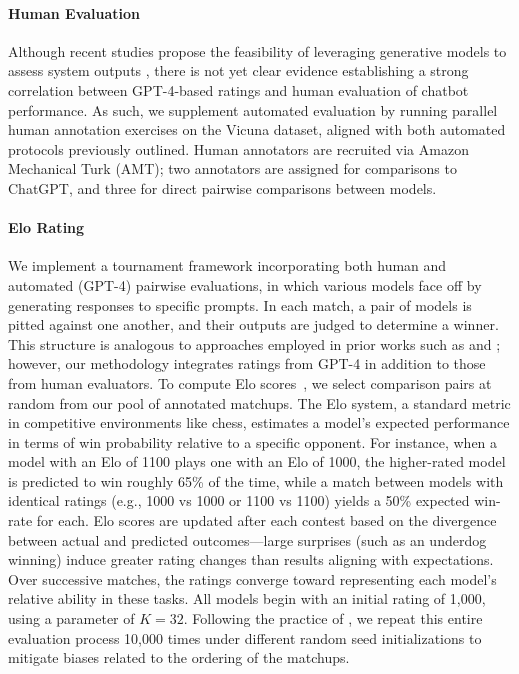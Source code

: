 \paragraph{Human Evaluation} Although recent studies propose the feasibility of leveraging generative models to assess system outputs \citep{fu2023gptscore}, there is not yet clear evidence establishing a strong correlation between GPT-4-based ratings and human evaluation of chatbot performance. As such, we supplement automated evaluation by running parallel human annotation exercises on the Vicuna dataset, aligned with both automated protocols previously outlined. Human annotators are recruited via Amazon Mechanical Turk (AMT); two annotators are assigned for comparisons to ChatGPT, and three for direct pairwise comparisons between models.

\paragraph{Elo Rating} We implement a tournament framework incorporating both human and automated (GPT-4) pairwise evaluations, in which various models face off by generating responses to specific prompts. In each match, a pair of models is pitted against one another, and their outputs are judged to determine a winner. This structure is analogous to approaches employed in prior works such as \citet{bai2022training} and \citet{vicuna2023}; however, our methodology integrates ratings from GPT-4 in addition to those from human evaluators. To compute Elo scores~\citep{elo1967proposed,elo1978rating}, we select comparison pairs at random from our pool of annotated matchups. The Elo system, a standard metric in competitive environments like chess, estimates a model’s expected performance in terms of win probability relative to a specific opponent. For instance, when a model with an Elo of 1100 plays one with an Elo of 1000, the higher-rated model is predicted to win roughly 65\% of the time, while a match between models with identical ratings (e.g., 1000 vs 1000 or 1100 vs 1100) yields a 50\% expected win-rate for each. Elo scores are updated after each contest based on the divergence between actual and predicted outcomes—large surprises (such as an underdog winning) induce greater rating changes than results aligning with expectations. Over successive matches, the ratings converge toward representing each model's relative ability in these tasks. All models begin with an initial rating of 1,000, using a parameter of $K=32$. Following the practice of \citet{vicuna2023}, we repeat this entire evaluation process 10,000 times under different random seed initializations to mitigate biases related to the ordering of the matchups.

